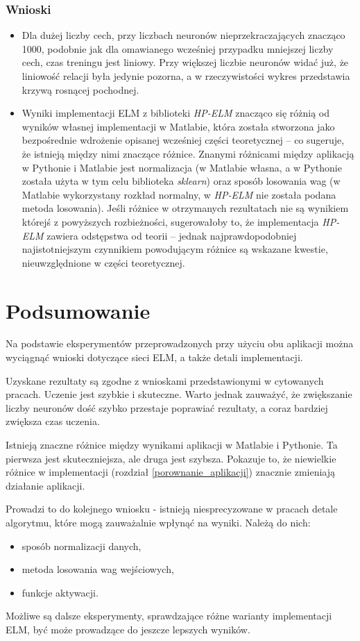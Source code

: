 \documentclass{article}
\begin{document}
\subsubsection{Wnioski}
\begin{itemize}
\item Dla dużej liczby cech, przy liczbach neuronów nieprzekraczających znacząco 1000, podobnie jak dla omawianego wcześniej przypadku mniejszej liczby cech, czas treningu jest liniowy. Przy większej liczbie neuronów widać już, że liniowość relacji była jedynie pozorna, a w rzeczywistości wykres przedstawia krzywą rosnącej pochodnej.
\item Wyniki implementacji ELM z biblioteki \textit{HP-ELM} znacząco się różnią od wyników własnej implementacji w Matlabie, która została stworzona jako bezpośrednie wdrożenie opisanej wcześniej części teoretycznej -- co sugeruje, że istnieją między nimi znaczące różnice. Znanymi różnicami między aplikacją w Pythonie i Matlabie jest normalizacja (w Matlabie własna, a w Pythonie została użyta w tym celu biblioteka \textit{sklearn}) oraz sposób losowania wag (w Matlabie wykorzystany rozkład normalny, w \textit{HP-ELM} nie została podana metoda losowania). Jeśli różnice w otrzymanych rezultatach nie są wynikiem którejś z powyższych rozbieżności, sugerowałoby to, że implementacja \textit{HP-ELM} zawiera odstępstwa od teorii -- jednak najprawdopodobniej najistotniejszym czynnikiem powodującym różnice są wskazane kwestie, nieuwzględnione w części teoretycznej.
\end{itemize}
\clearpage
\section*{Podsumowanie}
Na podstawie eksperymentów przeprowadzonych przy użyciu obu aplikacji można wyciągnąć wnioski dotyczące sieci ELM, a także detali implementacji.

Uzyskane rezultaty są zgodne z wnioskami przedstawionymi w cytowanych pracach.
Uczenie jest szybkie i skuteczne.
Warto jednak zauważyć, że zwiększanie liczby neuronów dość szybko przestaje poprawiać rezultaty, a coraz bardziej zwiększa czas uczenia.

Istnieją znaczne różnice między wynikami aplikacji w Matlabie i Pythonie. Ta pierwsza jest skuteczniejsza, ale druga jest szybsza. Pokazuje to, że niewielkie różnice w implementacji (rozdział \ref{porownanie_aplikacji}) znacznie zmieniają działanie aplikacji.

Prowadzi to do kolejnego wniosku - istnieją niesprecyzowane w pracach detale algorytmu, które mogą zauważalnie wpłynąć na wyniki.
Należą do nich:
\begin{itemize}
\item sposób normalizacji danych, 
\item metoda losowania wag wejściowych,
\item funkcje aktywacji.
\end{itemize}
Możliwe są dalsze eksperymenty, sprawdzające różne warianty implementacji ELM, być może prowadzące do jeszcze lepszych wyników.
\clearpage
{}
\end{document}

